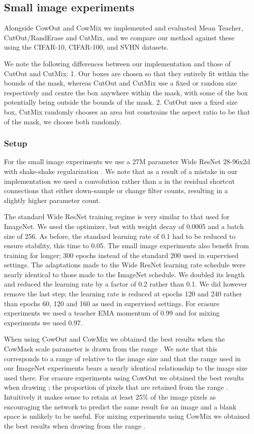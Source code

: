 \documentclass{article}
\begin{document}
\subsection{Small image experiments}
Alongside CowOut and CowMix we implemented and evaluated Mean Teacher, CutOut/RandErase and CutMix, and we compare our method against these using the CIFAR-10, CIFAR-100, and SVHN datasets.

We note the following differences between our implementation and those of CutOut and CutMix: 1. Our boxes are chosen so that they entirely fit within the bounds of the mask, whereas CutOut and CutMix use a fixed or random size respectively and centre the box anywhere within the mask, with some of the box potentially being outside the bounds of the mask. 2. CutOut uses a fixed size box, CutMix randomly chooses an area but constrains the aspect ratio to be that of the mask, we choose both randomly.



\subsubsection{Setup}

For the small image experiments we use a 27M parameter Wide ResNet 28-96x2d with shake-shake regularization \cite{Gastaldi:ShakeShake}. We note that as a result of a mistake in our implementation we used a  convolution rather than a  in the residual shortcut connections that either down-sample or change filter counts, resulting in a slightly higher parameter count.

The standard Wide ResNet training regime \cite{Zagoruyko:WRN} is very similar to that used for ImageNet.
We used the optimizer, but with weight decay of 0.0005 and a batch size of 256.
As before, the standard learning rate of 0.1 had to be reduced to ensure stability, this time to 0.05.
The small image experiments also benefit from training for longer; 300 epochs instead of the standard 200 used in supervised settings. The adaptations made to the Wide ResNet learning rate schedule were nearly identical to those
made to the ImageNet schedule. We doubled its length and reduced the learning rate by a factor
of 0.2 rather than 0.1. We did however remove the last step; the learning rate is reduced at epochs 120 and
240 rather than epochs 60, 120 and 160 as used in supervised settings.
For erasure experiments we used a teacher EMA momentum  of 0.99 and for mixing experiments we used 0.97.

When using CowOut and CowMix we obtained the best results when the CowMask scale parameter  is drawn from
the range . We note that this corresponds to a range of  relative to the  image size and that the  range used in our ImageNet experiments bears a nearly identical relationship to the  image size used there. For erasure experiments using CowOut we obtained the best results when drawing ; the proportion of pixels that are retained from the range . Intuitively it makes sense to retain at least 25\% of the image pixels as encouraging the network to predict the same result for an image and a blank space is unlikely to be useful. For mixing experiments using CowMix we obtained the best results when drawing  from the range .
\end{document}

